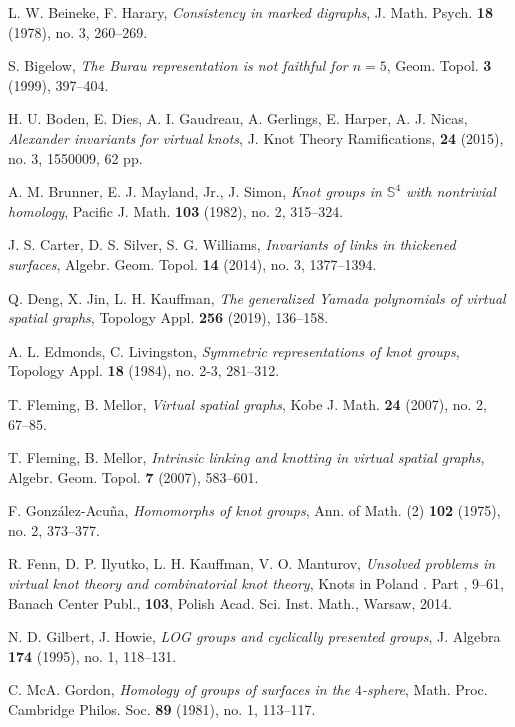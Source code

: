 \documentclass[11 pt, reqno]{amsart}
\theoremstyle{definition}
\numberwithin{equation}{subsection}
\newcommand{\RNum}[1]{\uppercase\expandafter{\romannumeral #1\relax}}
\begin{document}
\begin{thebibliography}{HD}
L. W. Beineke, F. Harary, \textit{Consistency in marked digraphs}, J. Math. Psych. \textbf{18} (1978), no. 3, 260--269.

S. Bigelow, \textit{The Burau representation is not faithful for {$n=5$}}, Geom. Topol. \textbf{3} (1999), 397--404.

H. U. Boden,  E. Dies, A. I. Gaudreau,  A. Gerlings,  E. Harper,  A. J. Nicas, \textit{Alexander invariants for virtual knots}, J. Knot Theory Ramifications, \textbf{24} (2015), no. 3, 1550009, 62 pp.

A. M. Brunner, E. J. Mayland, Jr., J. Simon, \textit{Knot groups in $\mathbb{S}^4$ with nontrivial homology}, Pacific J. Math. \textbf{103} (1982), no. 2, 315--324.

J. S. Carter, D. S. Silver, S. G. Williams, \textit{Invariants of links in thickened surfaces}, Algebr. Geom. Topol. \textbf{14} (2014), no. 3, 1377--1394.

Q. Deng, X. Jin, L. H. Kauffman, \textit{The generalized Yamada polynomials of virtual spatial graphs}, Topology Appl. \textbf{256} (2019), 136--158.

A. L. Edmonds, C. Livingston, \textit{Symmetric representations of knot groups}, Topology Appl. \textbf{18} (1984), no. 2-3, 281--312.

T. Fleming, B. Mellor, \textit{Virtual spatial graphs}, Kobe J. Math. \textbf{24} (2007), no. 2, 67--85.

T. Fleming, B. Mellor, \textit{Intrinsic linking and knotting in virtual spatial graphs}, Algebr. Geom. Topol. \textbf{7} (2007), 583--601.

F. Gonz{\'a}lez-Acu{\~n}a, \textit{Homomorphs of knot groups}, Ann. of Math. (2) \textbf{102} (1975), no. 2, 373--377.

R. Fenn, D. P. Ilyutko, L. H. Kauffman, V. O. Manturov,
\textit{Unsolved problems in virtual knot theory and combinatorial knot theory}, Knots in Poland \RNum{3}. Part \RNum{3}, 9--61, Banach Center Publ., \textbf{103}, Polish Acad. Sci. Inst. Math., Warsaw, 2014.


N. D. Gilbert, J. Howie, \textit{LOG groups and cyclically presented groups}, J. Algebra \textbf{174} (1995), no. 1, 118--131.

C. McA. Gordon, \textit{Homology of groups of surfaces in the $4$-sphere}, Math. Proc. Cambridge Philos. Soc. \textbf{89} (1981), no. 1, 113--117.


\end{thebibliography}
\end{document}
